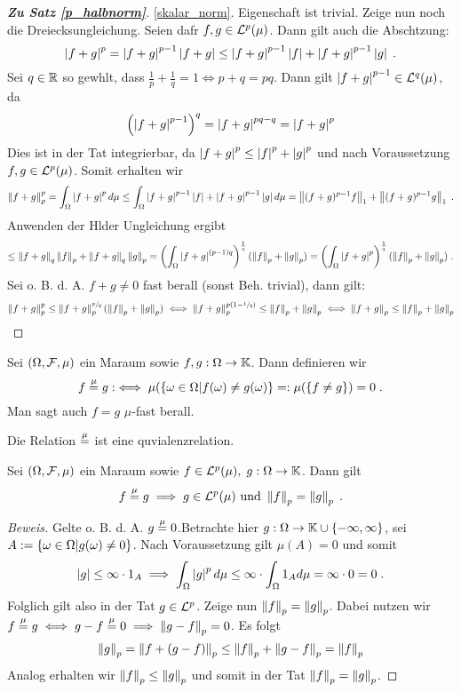\begin{proof}[\textbf{Zu Satz \ref{p_halbnorm}}]
	\ref{skalar_norm}. Eigenschaft ist trivial.
	Zeige nun noch die Dreiecksungleichung. Seien daf\us r \(f,g \in \mathcal{L}^p(\mu)\). Dann gilt auch die Absch\as tzung:
	\[\left\lvert f+g \right\rvert^p = \left\lvert f+g \right\rvert^{p-1} \left\lvert f+g \right\rvert \leq \left\lvert f+g \right\rvert^{p-1} \left\lvert f \right\rvert + \left\lvert f+g \right\rvert^{p-1} \left\lvert g \right\rvert  \;.\] 
	Sei \(q \in \mathbb{R}\) so gew\as hlt, dass \(\frac{1}{p} + \frac{1}{q} = 1 \iff p+q = pq\). Dann gilt \(\left\lvert f+g \right\rvert^{p-1} \in \mathcal{L}^q(\mu)\), da 
	\[\left(\left\lvert f+g \right\rvert^{p-1}\right)^q = \left\lvert f+g \right\rvert^{pq - q} = \left\lvert f+g \right\rvert^{p}\]
	Dies ist in der Tat integrierbar, da \(\left\lvert f+g \right\rvert^p \leq \left\lvert f \right\rvert^p + \left\lvert g \right\rvert^p\) und nach Voraussetzung \(f,g \in \mathcal{L}^p(\mu)\). Somit erhalten wir 
		\[\left\lVert f+g\right\rVert_{p}^p = \int_\Omega \left\lvert f+g \right\rvert^p  d\mu\leq  \int_\Omega  \left\lvert f+g \right\rvert^{p-1} \left\lvert f \right\rvert + \left\lvert f+g \right\rvert^{p-1} \left\lvert g \right\rvert d \mu = \left\lVert(f+g)^{p-1} f\right\rVert_{1} + \left\lVert(f+g)^{p-1} g\right\rVert_{1} \;.\]
		Anwenden der H\os lder Ungleichung ergibt
		\[\leq \left\lVert f+g\right\rVert_{q}\left\lVert f\right\rVert_{p} + \left\lVert f+g\right\rVert_{q}\left\lVert g\right\rVert_{p} = \left(\int_\Omega\left\lvert f+g \right\rvert^{(p-1)q}\right)^\frac{1}{q} (\left\lVert f\right\rVert_{p}+\left\lVert g\right\rVert_{p}) =  \left(\int_\Omega\left\lvert f+g \right\rvert^{p}\right)^\frac{1}{q} (\left\lVert f\right\rVert_{p}+\left\lVert g\right\rVert_{p})\;.\]
		Sei o. B. d. A. \(f+g \neq 0\) fast \us berall (sonst Beh. trivial), dann gilt: 
		\[\left\lVert f+g\right\rVert_{p}^p \leq \left\lVert f+g\right\rVert_{p}^{\sfrac{p}{q}}(\left\lVert f\right\rVert_{p}+\left\lVert g\right\rVert_{p}) \iff\left\lVert f+g\right\rVert_{p}^{p (1-\sfrac{1}{q})} \leq\left\lVert f\right\rVert_{p}+\left\lVert g\right\rVert_{p} \iff  \left\lVert f+g\right\rVert_{p} \leq \left\lVert f\right\rVert_{p}+\left\lVert g\right\rVert_{p}\]
\end{proof}

\begin{definition}
	Sei \((\Omega, \mathcal{F}, \mu)\) ein Ma\s raum sowie \(f, g: \Omega \to \mathbb{K}\). Dann definieren wir
	\[f \overset{\mu}{=} g :\iff \mu(\left\{\omega \in \Omega\vert f(\omega) \neq g(\omega)\right\} =: \mu(\left\{f\neq g\right\}) = 0\;.\]
	Man sagt auch \(f = g\) $\mu$-fast \us berall.
\end{definition}
\begin{rem}
	Die Relation \(\overset{\mu}{=}\) ist eine \As quvialenzrelation.
\end{rem}
\begin{theorem}
	Sei \((\Omega, \mathcal{F}, \mu)\) ein Ma\s raum sowie \(f\in \mathcal{L}^p(\mu), \; g:\Omega \to \mathbb{K}\). Dann gilt
	\[f \overset{\mu}{=} g \implies g \in \mathcal{L}^p(\mu) \text{ und } \left\lVert f\right\rVert_{p} = \left\lVert g\right\rVert_{p}\;.\]
	\label{Lp_Norm_wohldef}
\end{theorem}
\begin{proof}[Beweis]
	Gelte o. B. d. A. \(g \overset{\mu}{=} 0\).Betrachte hier \(g:\Omega \to \mathbb{K} \cup\left\{-\infty, \infty\right\}\), sei \(A:=\left\{\omega \in \Omega\vert g(\omega) \neq 0\right\}\). Nach Voraussetzung gilt \(\mu(A) = 0\) und somit
	\[\left\lvert g \right\rvert \leq \infty \cdot 1_A \implies \int_\Omega \left\lvert g \right\rvert^p d\mu \leq \infty \cdot \int_\Omega 1_A d\mu = \infty\cdot 0 = 0\;.\]
	Folglich gilt also in der Tat \(g\in \mathcal{L}^p\). Zeige nun \(\left\lVert f\right\rVert_{p} = \left\lVert g\right\rVert_{p}\). Dabei nutzen wir \(f\overset{\mu}{=} g \iff g-f \overset{\mu}{=} 0 \implies \left\lVert g-f\right\rVert_{p} = 0\). Es folgt
	\[\left\lVert g\right\rVert_{p} = \left\lVert f+(g-f)\right\rVert_{p} \leq \left\lVert f\right\rVert_{p} + \left\lVert g-f\right\rVert_{p} = \left\lVert f\right\rVert_{p}\]
	Analog erhalten wir \(\left\lVert f\right\rVert_{p} \leq \left\lVert g\right\rVert_{p}\) und somit in der Tat \(\left\lVert f\right\rVert_{p} = \left\lVert g\right\rVert_{p}\).
\end{proof}

